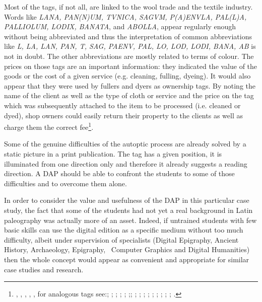 \documentclass[amsthm,ebook]{saparticle}
\begin{document}
\begin{figure}
\centering

\end{figure}
Most of the tags, if not all, are linked to the wool trade and the textile industry. Words like \emph{LANA, PAN(N)UM, TVNICA, SAGVM, P(A)ENVLA, PAL(L)A, PALLIOLUM, LODIX, BANATA}, and \emph{ABOLLA}, appear regularly enough without being abbreviated and
thus the interpretation of common abbreviations like \emph{L, LA, LAN, PAN, T, SAG, PAENV, PAL, LO, LOD, LODI, BANA, AB} is
not in doubt. The other abbreviations are mostly related to terms of colour. The prices on those tags are an important
information: they indicated the value of the goods or the cost of a given service (e.g. cleaning, fulling, dyeing). It
would also appear that they were used by fullers and dyers as ownership tags. By noting the name of the client as well
as the type of cloth or service and the price on the tag which was subsequently attached to the item to be processed
(i.e. cleaned or dyed), shop owners could easily return their property to the clients as well as charge them the
correct fee\footnote{\citet{radman_livaja_segestica_2007}, \citet{radman-livaja_roetiquettes_2010}, \citet{radman-livaja_5_2013}, \citet[165-172]{radman-livaja_two_2013}, \citet{radman-livaja_plombs_2014}, for analogous tags see:\citet[97-104]{mocsy_olom_1956}; \citet[195-210]{egger_funf_1968}; \citet[127-138]{frei-stolba_les_1984}; \citet[331-334]{frei-stolba_les_2011}; \citet[121-137]{schwinden_romerzeitliche_1985}; \citet[215-222]{schwinden_zwei_1993};\citet{romer-martijnse_romerzeitliche_1990}; \citet[5-48]{romer-martijnse_fruhkaiserzeitliche_1997}; \citet[301-305]{feugere_etiquette_1993}; \citet[211-220]{weiss_bleietiketten_1991}; \citet[29-40]{paci_etichette_1995}; \citet[207-216]{bassi_tre_1996}; \citet[121-135]{bizzarini_quattro_2005}; \citet[43-51]{buchi_etichette_2005}; \citet[42-110]{cresci_supellex_2010}; \citet[295-317]{jacques_artisanat_2010}; \citet[237-246]{wedenig_bleietikett_2013}.}. 

Some of the genuine difficulties of the autoptic process are already solved by a static picture in a print publication.
The tag has a given position, it is illuminated from one direction only and therefore it already suggests a reading
direction. A DAP should be able to confront the students to some of those difficulties and to overcome them alone.

In order to consider the value and usefulness of the DAP in this particular case study, the fact that some of the
students had not yet a real background in Latin paleography was actually more of an asset. Indeed, if untrained
students with few basic skills can use the digital edition as a specific medium without too much difficulty, albeit
under supervision of specialists (Digital Epigraphy, Ancient History, Archaeology, Epigraphy, \ Computer Graphics and
Digital Humanities) then the whole concept would appear as convenient and appropriate for similar case studies and
research. 
\end{document}
